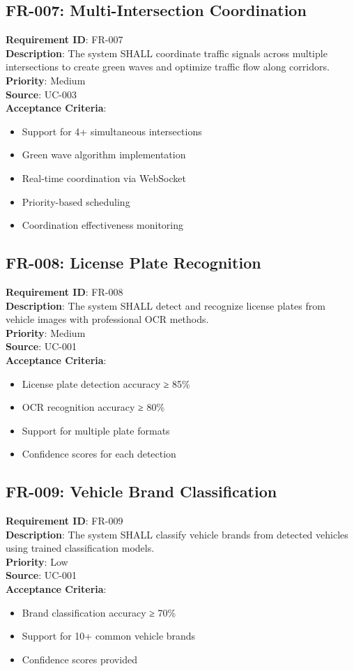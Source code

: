 \documentclass[12pt,a4paper]{article}
\begin{document}
\subsection{FR-007: Multi-Intersection Coordination}
\textbf{Requirement ID}: FR-007 \\
\textbf{Description}: The system SHALL coordinate traffic signals across multiple intersections to create green waves and optimize traffic flow along corridors. \\
\textbf{Priority}: Medium \\
\textbf{Source}: UC-003 \\
\textbf{Acceptance Criteria}:
\begin{itemize}
    \item Support for 4+ simultaneous intersections
    \item Green wave algorithm implementation
    \item Real-time coordination via WebSocket
    \item Priority-based scheduling
    \item Coordination effectiveness monitoring
\end{itemize}

\subsection{FR-008: License Plate Recognition}
\textbf{Requirement ID}: FR-008 \\
\textbf{Description}: The system SHALL detect and recognize license plates from vehicle images with professional OCR methods. \\
\textbf{Priority}: Medium \\
\textbf{Source}: UC-001 \\
\textbf{Acceptance Criteria}:
\begin{itemize}
    \item License plate detection accuracy ≥ 85\%
    \item OCR recognition accuracy ≥ 80\%
    \item Support for multiple plate formats
    \item Confidence scores for each detection
\end{itemize}

\subsection{FR-009: Vehicle Brand Classification}
\textbf{Requirement ID}: FR-009 \\
\textbf{Description}: The system SHALL classify vehicle brands from detected vehicles using trained classification models. \\
\textbf{Priority}: Low \\
\textbf{Source}: UC-001 \\
\textbf{Acceptance Criteria}:
\begin{itemize}
    \item Brand classification accuracy ≥ 70\%
    \item Support for 10+ common vehicle brands
    \item Confidence scores provided
\end{itemize}
\end{document}
